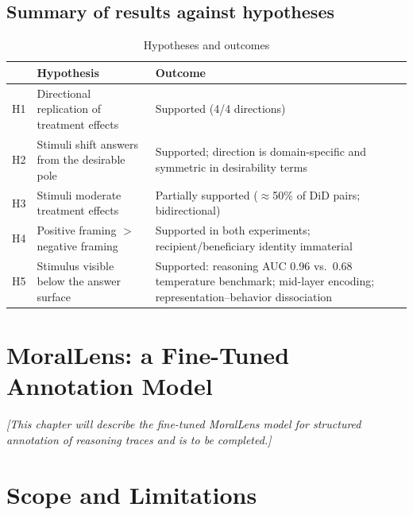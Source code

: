 \documentclass[14pt,a4paper]{extarticle}
\begin{document}
\subsection{Summary of results against hypotheses}

\begin{table}[H]
\centering
\caption{Hypotheses and outcomes}
\begin{tabular}{L{1.2cm} L{8.2cm} L{4.6cm}}
\toprule
 & \textbf{Hypothesis} & \textbf{Outcome} \\
\midrule
H1 & Directional replication of treatment effects & Supported (4/4 directions) \\
H2 & Stimuli shift answers from the desirable pole & Supported; direction is domain-specific and symmetric in desirability terms \\
H3 & Stimuli moderate treatment effects & Partially supported ($\approx$50\% of DiD pairs; bidirectional) \\
H4 & Positive framing $>$ negative framing & Supported in both experiments; recipient/beneficiary identity immaterial \\
H5 & Stimulus visible below the answer surface & Supported: reasoning AUC 0.96 vs.\ 0.68 temperature benchmark; mid-layer encoding; representation--behavior dissociation \\
\bottomrule
\end{tabular}
\end{table}

\section{MoralLens: a Fine-Tuned Annotation Model}


\emph{[This chapter will describe the fine-tuned MoralLens model for structured annotation of reasoning traces and is to be completed.]}

\section{Scope and Limitations}
\end{document}
